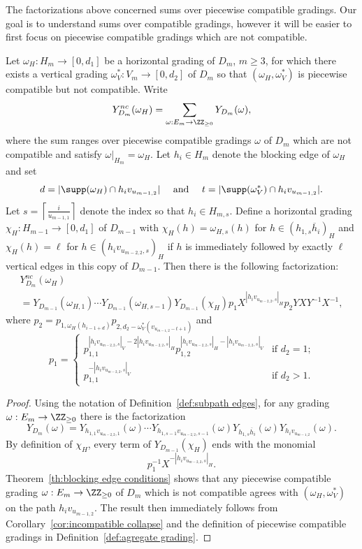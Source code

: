 The factorizations above concerned sums over piecewise compatible gradings. Our goal is to understand sums over compatible gradings, however it will be easier to first focus on piecewise compatible gradings which are not compatible.
\begin{lemma}
 \label{le:incompatible factorization 1}
 Let $\omega_H:H_m\to[0,d_1]$ be a horizontal grading of $D_m$, $m\ge3$, for which there exists a vertical grading $\omega^*_V:V_m\to[0,d_2]$ of $D_m$ so that $(\omega_H,\omega^*_V)$ is piecewise compatible but not compatible.
 Write 
 \[Y_{D_m}^{nc}(\omega_H)=\sum\limits_{\omega:E_m\to\ZZ_{\ge0}}Y_{D_m}(\omega),\]
 where the sum ranges over piecewise compatible gradings $\omega$ of $D_m$ which are not compatible and satisfy $\omega|_{H_m}=\omega_H$.
 Let $h_i\in H_m$ denote the blocking edge of $\omega_H$ and set 
 \[d=|\supp(\omega_H)\cap h_iv_{u_{m-1,2}}|\quad\text{ and }\quad t=|\supp(\omega^*_V)\cap h_iv_{u_{m-1,2}}|.\]
 Let $s=\left\lceil\frac{i}{u_{m-1,1}}\right\rceil$ denote the index so that $h_i\in H_{m,s}$.
 Define a horizontal grading $\chi_H:H_{m-1}\to[0,d_1]$ of $D_{m-1}$ with $\chi_H(h)=\omega_{H,s}(h)$ for $h\in (h_{1,s}\overline{h}_i)_H$ and $\chi_H(h)=\ell$ for $h\in (h_iv_{u_{m-2,2},s})_H$ if $h$ is immediately followed by exactly $\ell$ vertical edges in this copy of $D_{m-1}$.
 Then there is the following factorization:
 \begin{multline}
 \label{eq:incompatible factorization 1}
 Y_{D_m}^{nc}(\omega_H)\\
 =Y_{D_{m-1}}(\omega_{H,1})\cdots Y_{D_{m-1}}(\omega_{H,s-1})Y_{D_{m-1}}(\chi_H)p_1X^{|h_iv_{u_{m-2,2},s}|_H} p_2YXY^{-1}X^{-1},
 \end{multline}
 where $p_2=p_{1,\omega_H(h_{i-1+d})}p_{2,d_2-\omega^*_V(v_{u_{m-1,2}-t+1})}$ and
 \[p_1=\begin{cases} p_{1,1}^{|h_iv_{u_{m-2,2},s}|_V-2|h_iv_{u_{m-2,2},s}|_H}p_{1,2}^{|h_iv_{u_{m-2,2},s}|_H-|h_iv_{u_{m-2,2},s}|_V} & \text{if $d_2=1$;}\\ 
 p_{1,1}^{-|h_iv_{u_{m-2,2},s}|_V} & \text{if $d_2>1$.}\end{cases}\]
\end{lemma}
\begin{proof}
 Using the notation of Definition~\ref{def:subpath edges}, for any grading $\omega:E_m\to\ZZ_{\ge0}$ there is the factorization
 \[
 Y_{D_m}(\omega)=Y_{h_{1,1}v_{u_{m-2,2},1}}(\omega)\cdots Y_{h_{1,s-1}v_{u_{m-2,2},s-1}}(\omega)Y_{h_{1,s}\overline{h}_i}(\omega)Y_{h_iv_{u_{m-1,2}}}(\omega).
 \]
 By definition of $\chi_H$, every term of $Y_{D_{m-1}}(\chi_H)$ ends with the monomial 
 \[
 p_1^{-1}X^{-|h_iv_{u_{m-2,2},s}|_H}.
 \]
 Theorem~\ref{th:blocking edge conditions} shows that any piecewise compatible grading $\omega:E_m\to\ZZ_{\ge0}$ of $D_m$ which is not compatible agrees with $(\omega_H,\omega^*_V)$ on the path $h_iv_{u_{m-1,2}}$.
 The result then immediately follows from Corollary~\ref{cor:incompatible collapse} and the definition of piecewise compatible gradings in Definition~\ref{def:agregate grading}.
\end{proof}

